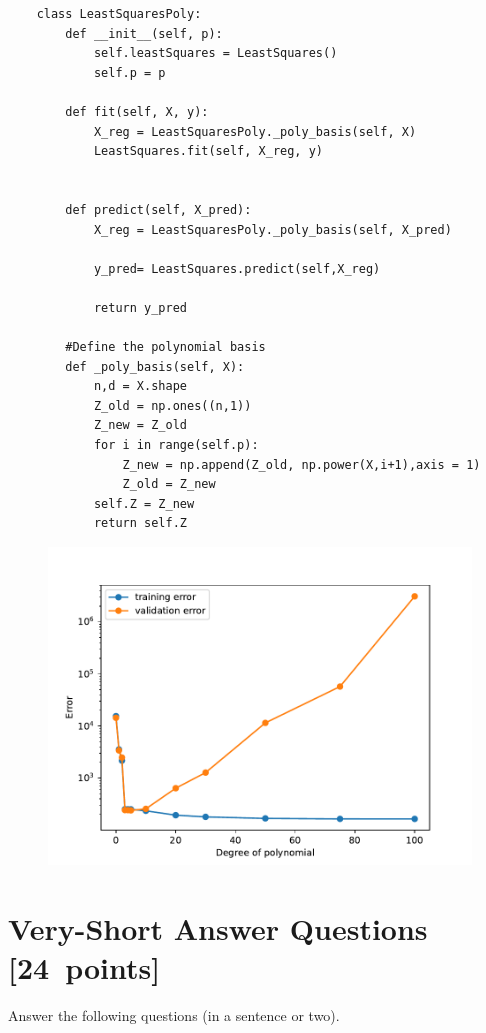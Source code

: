 \documentclass{article}
\newcommand{\blu}[1]{{\textcolor{blu}{#1}}}
\let\ask\blu
\newcommand\pts[1]{\textcolor{pointscolour}{[#1~points]}}
\begin{document}
\begin{verbatim}
	class LeastSquaresPoly:
		def __init__(self, p):
			self.leastSquares = LeastSquares()
			self.p = p

		def fit(self, X, y):
			X_reg = LeastSquaresPoly._poly_basis(self, X)
			LeastSquares.fit(self, X_reg, y)


		def predict(self, X_pred):
			X_reg = LeastSquaresPoly._poly_basis(self, X_pred)

			y_pred= LeastSquares.predict(self,X_reg)

			return y_pred

		#Define the polynomial basis
		def _poly_basis(self, X):
			n,d = X.shape
			Z_old = np.ones((n,1))
			Z_new = Z_old
			for i in range(self.p):
				Z_new = np.append(Z_old, np.power(X,i+1),axis = 1)
				Z_old = Z_new
			self.Z = Z_new
			return self.Z
\end{verbatim}

\begin{figure}
	\centering
	\includegraphics[width = .7\textwidth]{figs/polynomial_error_curves.pdf}
\end{figure}

\clearpage
\section{Very-Short Answer Questions \pts{24}}

\ask{Answer the following questions (in a sentence or two).}
\end{document}
